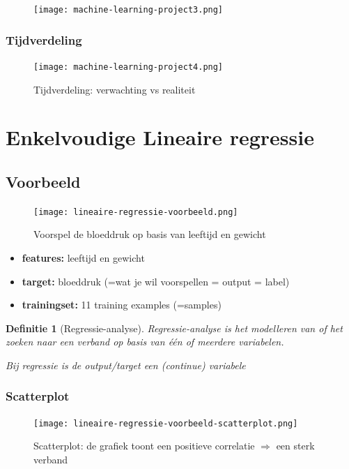 \documentclass{article}
\newtheorem{theorem}{Definitie}[section]
\begin{document}
\begin{figure}[H]
    \centering
    \texttt{[image: machine-learning-project3.png]}
    \caption{}
\end{figure}

\subsubsection{Tijdverdeling}


\begin{figure}[H]
    \centering
    \texttt{[image: machine-learning-project4.png]}
    \caption{Tijdverdeling: verwachting vs realiteit}
\end{figure}

\section{Enkelvoudige Lineaire regressie}

\subsection{Voorbeeld}

\begin{figure}[H]
    \centering
    \texttt{[image: lineaire-regressie-voorbeeld.png]}
    \caption{Voorspel de bloeddruk op basis van leeftijd en gewicht}
\end{figure}

\begin{itemize}
    \item \textbf{features:} leeftijd en gewicht
    \item \textbf{target:} bloeddruk (=wat je wil voorspellen = output = label)
    \item \textbf{trainingset:} 11 training examples (=samples)
\end{itemize}

\begin{theorem}[Regressie-analyse]
Regressie-analyse is het modelleren van of het zoeken naar een verband op basis van één of meerdere variabelen.

Bij regressie is de output/target een (continue) variabele
\end{theorem}

\subsubsection{Scatterplot}

\begin{figure}[H]
    \centering
    \texttt{[image: lineaire-regressie-voorbeeld-scatterplot.png]}
    \caption{Scatterplot: de grafiek toont een positieve correlatie $\Rightarrow$ een sterk verband}
\end{figure}
\end{document}
